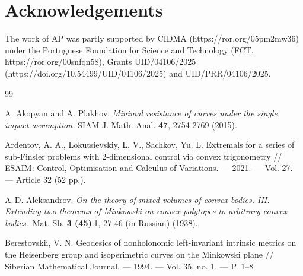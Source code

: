 \documentclass[a4paper,12pt]{article}
\theoremstyle{remark}
\theoremstyle{definition}
\begin{document}
\section*{Acknowledgements}

The work of AP was partly supported by CIDMA (https://ror.org/05pm2mw36) under the Portuguese Foundation for Science and Technology (FCT, https://ror.org/00snfqn58), Grants UID/04106/2025 (https://doi.org/10.54499/UID/04106/2025) and UID/PRR/04106/2025.


\begin{thebibliography}{99}

A. Akopyan and A. Plakhov. {\it Minimal resistance of curves under the single impact assumption.} SIAM J. Math. Anal. {\bf 47}, 2754-2769 (2015). %

 Ardentov, A. A., Lokutsievskiy, L. V., Sachkov, Yu. L. Extremals for a series of sub-Finsler problems with 2-dimensional control via convex trigonometry // ESAIM: Control, Optimisation and Calculus of Variations. — 2021. — Vol. 27. — Article 32 (52 pp.).

A.\,D. Aleksandrov. {\it On the theory of mixed volumes of convex bodies. III. Extending two theorems of Minkowski on convex polytopes to arbitrary convex bodies}.\, Mat. Sb. {\bf 3 (45)}:1, 27-46 (in Russian) (1938).



 Berestovskii, V. N. Geodesics of nonholonomic left-invariant intrinsic metrics on the Heisenberg group and isoperimetric curves on the Minkowski plane // Siberian Mathematical Journal. — 1994. — Vol. 35, no. 1. — P. 1–8


\end{thebibliography}
\end{document}

